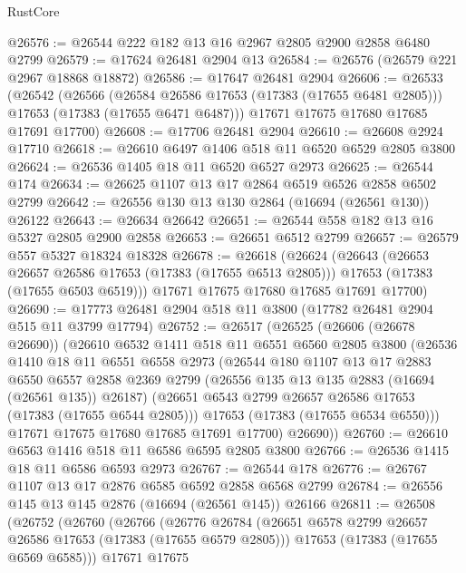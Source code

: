 \begin{lexlean}{RustCore}
\begin{coremodule}
@26576 := @26544 @222 @182 @13 @16 @2967 @2805 @2900 @2858 @6480 @2799
@26579 := @17624 @26481 @2904 @13
@26584 := @26576 (@26579 @221 @2967 @18868 @18872)
@26586 := @17647 @26481 @2904
@26606 := @26533
    (@26542
      (@26566
        (@26584 @26586 @17653 (@17383 (@17655 @6481 @2805)))
        @17653
        (@17383 (@17655 @6471 @6487)))
      @17671
      @17675
      @17680
      @17685
      @17691
      @17700)
@26608 := @17706 @26481 @2904
@26610 := @26608 @2924 @17710
@26618 := @26610 @6497 @1406 @518 @11 @6520 @6529 @2805 @3800
@26624 := @26536 @1405 @18 @11 @6520 @6527 @2973
@26625 := @26544 @174
@26634 := @26625 @1107 @13 @17 @2864 @6519 @6526 @2858 @6502 @2799
@26642 := @26556 @130 @13 @130 @2864 (@16694 (@26561 @130)) @26122
@26643 := @26634 @26642
@26651 := @26544 @558 @182 @13 @16 @5327 @2805 @2900 @2858
@26653 := @26651 @6512 @2799
@26657 := @26579 @557 @5327 @18324 @18328
@26678 := @26618
    (@26624
      (@26643
        (@26653 @26657 @26586 @17653 (@17383 (@17655 @6513 @2805)))
        @17653
        (@17383 (@17655 @6503 @6519)))
      @17671
      @17675
      @17680
      @17685
      @17691
      @17700)
@26690 := @17773 @26481 @2904 @518 @11 @3800 (@17782 @26481 @2904 @515 @11 @3799 @17794)
@26752 := @26517
    (@26525
      (@26606 (@26678 @26690))
      (@26610
        @6532
        @1411
        @518
        @11
        @6551
        @6560
        @2805
        @3800
        (@26536
          @1410
          @18
          @11
          @6551
          @6558
          @2973
          (@26544
            @180
            @1107
            @13
            @17
            @2883
            @6550
            @6557
            @2858
            @2369
            @2799
            (@26556 @135 @13 @135 @2883 (@16694 (@26561 @135)) @26187)
            (@26651 @6543 @2799 @26657 @26586 @17653 (@17383 (@17655 @6544 @2805)))
            @17653
            (@17383 (@17655 @6534 @6550)))
          @17671
          @17675
          @17680
          @17685
          @17691
          @17700)
        @26690))
@26760 := @26610 @6563 @1416 @518 @11 @6586 @6595 @2805 @3800
@26766 := @26536 @1415 @18 @11 @6586 @6593 @2973
@26767 := @26544 @178
@26776 := @26767 @1107 @13 @17 @2876 @6585 @6592 @2858 @6568 @2799
@26784 := @26556 @145 @13 @145 @2876 (@16694 (@26561 @145)) @26166
@26811 := @26508
    (@26752
      (@26760
        (@26766
          (@26776
            @26784
            (@26651 @6578 @2799 @26657 @26586 @17653 (@17383 (@17655 @6579 @2805)))
            @17653
            (@17383 (@17655 @6569 @6585)))
          @17671
          @17675

\end{coremodule}
\end{lexlean}
